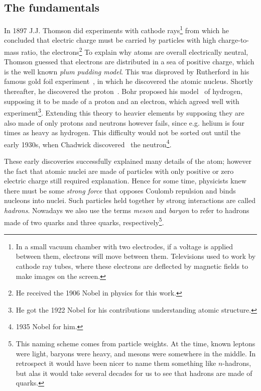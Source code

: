 \subsection{The fundamentals}


In 1897 J.J. Thomson did experiments with cathode rays\footnote{In a small
vacuum chamber with two electrodes, if a voltage is applied between them,
electrons will move between them. Televisions used to work by cathode ray tubes,
 where these electrons are deflected by magnetic fields
to make images on the screen.}
from which he concluded that electric charge must be carried by particles
with high charge-to-mass ratio, the electrons\footnote{He received the 1906
Nobel in physics for this work.} 
To explain why atoms are overall electrically neutral, Thomson guessed that
electrons are distributed in a sea of positive charge, which is the
well known {\it plum pudding model}. This was
disproved by Rutherford in his famous gold foil
experiment~\cite{rutherford_scattering_1911}, in which he discovered
the atomic nucleus. Shortly thereafter, he discovered the
proton~\cite{rutherford_collision_1919}.
Bohr proposed his model~\cite{bohr_constitution_1913}
of hydrogen, supposing it to be made of a proton and an electron, which agreed
well with experiment\footnote{He got the 1922 Nobel for his
contributions understanding atomic structure.}. Extending this theory to 
heavier elements by supposing
they are also made of only protons and neutrons however fails, since e.g. helium
is four times as heavy as hydrogen. This difficulty would not be sorted out
until the early 1930s, when Chadwick discovered~\cite{chadwick_possible_1932}
the neutron\footnote{1935 Nobel for him.}.


These early discoveries successfully explained many details of the atom; however
the fact that atomic nuclei are made of particles with only positive or zero
electric charge still required explanation.
Hence for some time, physicists
knew there must be some {\it strong force} that opposes
Coulomb repulsion and binds nucleons into nuclei.
Such particles held together by strong interactions are called
{\it hadrons}. Nowadays we also use the terms {\it meson}
 and {\it baryon} to refer to hadrons made of
two quarks and three quarks, respectively\footnote{This naming scheme
comes from particle weights. At the time, known leptons were light, 
baryons were heavy, and mesons were somewhere in the middle. In retrospect it
would have been nicer to name them something like $n$-hadrons, but alas it would
take several decades for us to see that hadrons are made of quarks.}.


